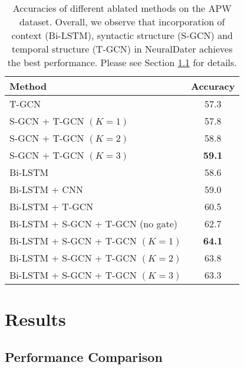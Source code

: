 \documentclass[11pt,a4paper]{article}
\newcommand{\refsec}[1]{Section \ref{#1}}
\newcommand{\method}{NeuralDater}
\begin{document}
\begin{table}[!t]
	\begin{small}
		\centering
		\begin{tabular}{lc}
			\toprule
			Method 			 & Accuracy \\
			\midrule		
			\addlinespace
T-GCN 								& 57.3 \\
			S-GCN + T-GCN $(K=1)$				& 57.8 \\
			S-GCN + T-GCN $(K=2)$				& 58.8 \\
			S-GCN + T-GCN $(K=3)$				& \textbf{59.1} \\
			\midrule
			Bi-LSTM 							& 58.6 \\
			Bi-LSTM + CNN 						& 59.0 \\
			Bi-LSTM + T-GCN						& 60.5 \\
			Bi-LSTM + S-GCN + T-GCN (no gate)	& 62.7 \\
			Bi-LSTM + S-GCN + T-GCN $(K=1)$		& \textbf{64.1} \\
			Bi-LSTM + S-GCN + T-GCN $(K=2)$		& 63.8 \\
			Bi-LSTM + S-GCN + T-GCN $(K=3)$		& 63.3 \\
			\bottomrule
		\end{tabular}
	\caption{\label{tb:result_ablation}Accuracies of different ablated methods on the APW dataset. Overall, we observe that incorporation of context (Bi-LSTM), syntactic structure (S-GCN) and temporal structure (T-GCN) in \method{} achieves the best performance. Please see \refsec{sec:perf_comp} for details.}
\end{small}
\end{table}


\section{Results}
\label{sec:results}

\subsection{Performance Comparison}
\label{sec:perf_comp}
\end{document}
